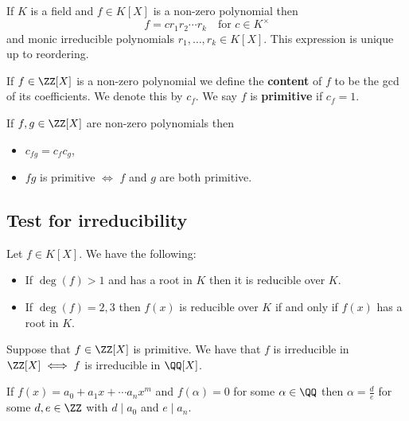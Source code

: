 \documentclass[12pt, a4paper]{article}
\begin{document}
\begin{theorem}
    If \(K\) is a field and \(f\in K[X]\) is a non-zero polynomial then 
    \[f=cr_1r_2\cdots r_k \quad \text{for } c\in K^{\times}\]
    and monic irreducible polynomials \(r_1,\ldots,r_k \in K[X]\). This expression is unique up to reordering.
\end{theorem}

\begin{definition}
    If \(f\in \ZZ[X]\) is a non-zero polynomial we define the \textbf{content} of \(f\) to be the gcd of its coefficients. We denote this by \(c_f\). We say \(f\) is \textbf{primitive} if \(c_f=1\).
\end{definition}

\begin{lemma}
    If \(f,g\in \ZZ[X]\) are non-zero polynomials then 
    \begin{itemize}
        \item \(c_{fg}=c_f c_g\),
        \item \(fg\) is primitive \(\iff\) \(f\) and \(g\) are both primitive.
    \end{itemize}
\end{lemma}

\subsection{Test for irreducibility}

\begin{mdprop}
    Let \(f \in K[X]\). We have the following:
    \begin{itemize}
        \item If \(\deg(f)>1\) and has a root in \(K\) then it is reducible over \(K\).
        \item If \(\deg(f)=2,3\) then \(f(x)\) is reducible over \(K\) if and only if \(f(x)\) has a root in \(K\).
    \end{itemize}
\end{mdprop}

\begin{mdlemma}
    Suppose that \(f\in \ZZ[X]\) is primitive. We have that \(f\) is irreducible in \(\ZZ[X] \iff f\) is irreducible in \(\QQ[X]\).
\end{mdlemma}

\begin{corollary}
    If \(f(x)=a_0+a_1x+\cdots a_nx^m\) and \(f(\alpha)=0\) for some \(\alpha\in \QQ\) then \(\alpha=\frac{d}{e}\) for some \(d,e\in \ZZ\) with \(d\mid a_0\) and \(e\mid a_n\).
\end{corollary}
\end{document}
